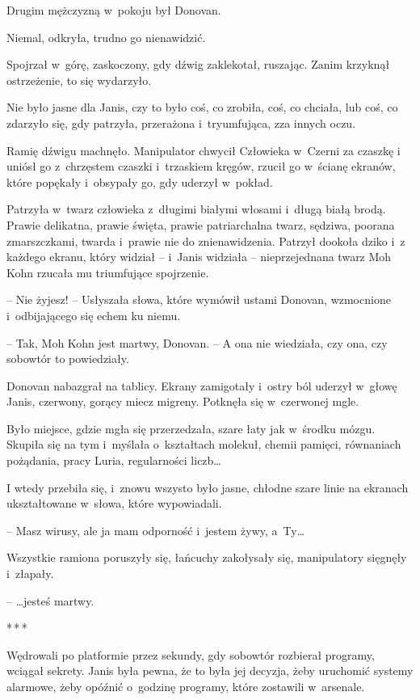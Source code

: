 \documentclass[oneside,polish,11pt,sfheadings]{mwbk}
\newcommand{\threeast}{\bigskip\par\centerline{*\,*\,*}\medskip\par}%
\begin{document}
Drugim mężczyzną w~pokoju był Donovan.

Niemal, odkryła, trudno go nienawidzić.

Spojrzał w~górę, zaskoczony, gdy dźwig zaklekotał, ruszając. Zanim
krzyknął ostrzeżenie, to się wydarzyło.

Nie było jasne dla Janis, czy to było coś, co zrobiła, coś, co chciała,
lub coś, co zdarzyło się, gdy patrzyła, przerażona i~tryumfująca, zza
innych oczu.

Ramię dźwigu machnęło. Manipulator chwycił Człowieka w~Czerni za czaszkę
i uniósł go z~chrzęstem czaszki i~trzaskiem kręgów, rzucił go w~ścianę
ekranów, które popękały i~obsypały go, gdy uderzył w~pokład.

Patrzyła w~twarz człowieka z~długimi białymi włosami i~długą białą
brodą. Prawie delikatna, prawie święta, prawie patriarchalna twarz,
sędziwa, poorana zmarszczkami, twarda i~prawie nie do znienawidzenia.
Patrzył dookoła dziko i~z każdego ekranu, który widział -- i~Janis
widziała -- nieprzejednana twarz Moh Kohn rzucała mu triumfujące
spojrzenie.

-- Nie żyjesz! -- Usłyszała słowa, które wymówił ustami Donovan,
wzmocnione i~odbijającego się echem ku niemu.

-- Tak, Moh Kohn jest martwy, Donovan. -- A ona nie wiedziała, czy ona,
czy sobowtór to powiedziały.

Donovan nabazgrał na tablicy. Ekrany zamigotały i~ostry ból uderzył w~głowę Janis, czerwony, gorący miecz migreny. Potknęła się w~czerwonej
mgle.

Było miejsce, gdzie mgła się przerzedzała, szare łaty jak w~środku
mózgu. Skupiła się na tym i~myślała o~kształtach molekuł, chemii
pamięci, równaniach pożądania, pracy Luria, regularności liczb\ldots

I wtedy przebiła się, i~znowu wszysto było jasne, chłodne szare linie na
ekranach ukształtowane w~słowa, które wypowiadali. 

-- Masz wirusy, ale ja
mam odporność i~jestem żywy, a~Ty\ldots

Wszystkie ramiona poruszyły się, łańcuchy zakołysały się, manipulatory
sięgnęły i~złapały.

-- \ldots jesteś martwy.
  \threeast 

Wędrowali po platformie przez sekundy, gdy sobowtór rozbierał programy,
wciągał sekrety. Janis była pewna, że to była jej decyzja, żeby
uruchomić systemy alarmowe, żeby opóźnić o~godzinę programy, które
zostawili w~arsenale.
\end{document}
